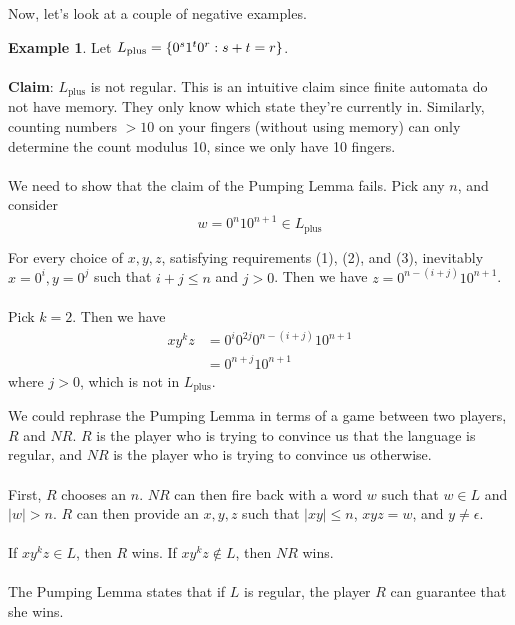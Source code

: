 \documentclass[]{article}
\DeclarePairedDelimiter{\set}{\lbrace}{\rbrace}
\theoremstyle{definition}
\newtheorem{ex}{Example}[section]
\begin{document}
        Now, let's look at a couple of negative examples.
        \begin{ex}
          Let $L_\text{plus} = \set{0^s 1^t 0^r : s + t = r}$.
          \\ \\
          \textbf{Claim}: $L_\text{plus}$ is not regular. This is an intuitive claim since finite automata do not have memory. They only know which state they're currently in. Similarly, counting numbers $> 10$ on your fingers (without using memory) can only determine the count modulus 10, since we only have 10 fingers.
          \\ \\
          We need to show that the claim of the Pumping Lemma fails. Pick any $n$, and consider
          $$
            w = 0^n 1 0^{n + 1} \in L_\text{plus}
          $$

          For every choice of $x, y, z$, satisfying requirements (1), (2), and (3), inevitably $x = 0^i, y = 0^j$ such that $i+j \le n$ and $j > 0$. Then we have $z = 0^{n - (i + j)} 1 0^{n + 1}$.
          \\ \\
          Pick $k = 2$. Then we have
          \begin{align*}
            xy^kz &= 0^i 0^{2j} 0^{n - (i + j)} 1 0^{n + 1} \\
            &= 0^{n + j} 1 0^{n + 1}
          \end{align*}
          where $j > 0$, which is not in $L_\text{plus}$.
        \end{ex}

        We could rephrase the Pumping Lemma in terms of a game between two players, $R$ and $NR$. $R$ is the player who is trying to convince us that the language is regular, and $NR$ is the player who is trying to convince us otherwise.
        \\ \\
        First, $R$ chooses an $n$. $NR$ can then fire back with a word $w$ such that $w \in L$ and $|w| > n$. $R$ can then provide an $x, y, z$ such that $|xy| \le n$, $xyz = w$, and $y \ne \epsilon$.
        \\ \\
        If $xy^kz \in L$, then $R$ wins. If $xy^kz \not \in L$, then $NR$ wins.
        \\ \\
        The Pumping Lemma states that if $L$ is regular, the player $R$ can guarantee that she wins.
\end{document}

